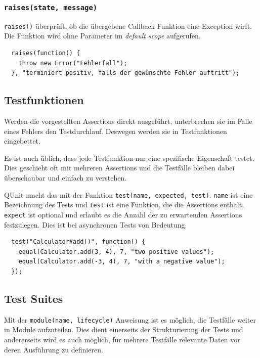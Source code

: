 \documentclass[11pt, a4paper]{article}
\begin{document}
\subsubsection*{\texttt{raises(state, message)}}

\texttt{raises()} überprüft, ob die übergebene Callback Funktion eine Exception
wirft. Die Funktion wird ohne Parameter im \emph{default scope} aufgerufen.

\begin{verbatim}
  raises(function() {
    throw new Error("Fehlerfall");
  }, "terminiert positiv, falls der gewünschte Fehler auftritt");
\end{verbatim}

\subsection{Testfunktionen}

Werden die vorgestellten Assertions direkt ausgeführt, unterbrechen sie
im Falle eines Fehlers den Testdurchlauf. Deswegen werden sie in Testfunktionen
eingebettet.

Es ist auch üblich, dass jede Testfunktion nur eine spezifische Eigenschaft
testet. Dies geschieht oft mit mehreren Assertions und die Testfälle
bleiben dabei überschaubar und einfach zu verstehen.

QUnit macht das mit der Funktion \texttt{test(name, expected, test)}.
\texttt{name} ist eine Bezeichnung des Tests und \texttt{test} ist eine
Funktion, die die Assertions enthält. \texttt{expect} ist optional und
erlaubt es die Anzahl der zu erwartenden Assertions festzulegen. Dies ist
bei asynchronen Tests von Bedeutung.

\begin{verbatim}
  test("Calculator#add()", function() {
    equal(Calculator.add(3, 4), 7, "two positive values");
    equal(Calculator.add(-3, 4), 7, "with a negative value");
  });
\end{verbatim}

\clearpage

\subsection{Test Suites}

Mit der \texttt{module(name, lifecycle)} Anweisung ist es möglich, die Testfälle
weiter in Module aufzuteilen. Dies dient einerseits der Strukturierung der Tests
und andererseits wird es auch möglich, für mehrere Testfälle relevante Daten vor
deren Ausführung zu definieren.
\end{document}
